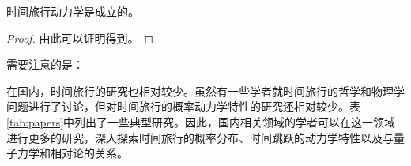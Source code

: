 \begin{theorem}
    时间旅行动力学是成立的。
\end{theorem}

\begin{proof}
    由此可以证明得到。
\end{proof}

\begin{remark}
    需要注意的是：
\end{remark}

在国内，时间旅行的研究也相对较少。虽然有一些学者就时间旅行的哲学和物理学问题进行了讨论，但对时间旅行的概率动力学特性的研究还相对较少。表\ref{tab:papers}中列出了一些典型研究。因此，国内相关领域的学者可以在这一领域进行更多的研究，深入探索时间旅行的概率分布、时间跳跃的动力学特性以及与量子力学和相对论的关系。
\begin{table}[htbp]
  \caption{时间旅行概率动力学研究论文情况}
  \centering
  \label{tab:papers}
\end{table}

